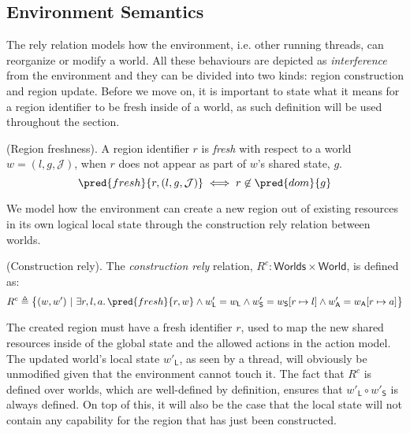 \subsection{Environment Semantics}

The rely relation models how the environment, i.e. other running threads, can reorganize or modify a world. All these behaviours are depicted as \textit{interference} from the environment and they can be divided into two kinds: region construction and region update. Before we move on, it is important to state what it means for a region identifier to be fresh inside of a world, as such definition will be used throughout the section.

\begin{defn}
	(Region freshness).
	A region identifier $r$ is \emph{fresh} with respect to a world $w = (l, g, \mathcal{J})$, when $r$ does not appear as part of $w$'s shared state, $g$.
	\[
		\pred{fresh}{r, (l, g, \mathcal{J})}
			\iff
		r \not\in \pred{dom}{g}
	\]
\end{defn}

We model how the environment can create a new region out of existing resources in its own logical local state through the construction rely relation between worlds.
\begin{defn}
	(Construction rely).
	The \emph{construction rely} relation, $R^c : \mathsf{Worlds} \times \mathsf{World}$, is defined as:
	\[
		R^c \triangleq \big\{ (w, w')\ |\ 
			\exists r, l, a \ldotp \pred{fresh}{r, w} \land w'_\mathsf{L} = w_\mathsf{L} \land w'_\mathsf{S} = w_\mathsf{S}[r \mapsto l] \land w'_\mathsf{A} = w_\mathsf{A}[r \mapsto a]
		\big\}
	\]
\end{defn}
The created region must have a fresh identifier $r$, used to map the new shared resources inside of the global state and the allowed actions in the action model. The updated world's local state $w'_\mathsf{L}$, as seen by a thread, will obviously be unmodified given that the environment cannot touch it. The fact that $R^c$ is defined over worlds, which are well-defined by definition, ensures that $w'_\mathsf{L} \circ w'_\mathsf{S}$ is always defined. On top of this, it will also be the case that the local state will not contain any capability for the region that has just been constructed.

